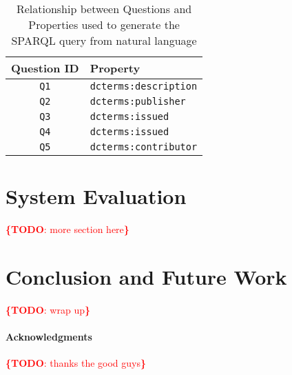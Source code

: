 \documentclass[runningheads,a4paper]{llncs}
\newcommand{\todo}[1]{\noindent\textcolor{red}{{\bf \{TODO}: #1{\bf \}}}}
\begin{document}
\begin{table}
\centering
\caption{Relationship between Questions and Properties used to generate the SPARQL query from natural language}
\label{tab:propTable}
\begin{tabular}{|c|l|} \hline
\textbf{Question ID} & \textbf{Property} \\ \hline
\texttt{Q1} & \texttt{dcterms:description}  \\ \hline
\texttt{Q2} & \texttt{dcterms:publisher}  \\ \hline 
\texttt{Q3} & \texttt{dcterms:issued}  \\ \hline
\texttt{Q4} & \texttt{dcterms:issued}  \\ \hline
\texttt{Q5} & \texttt{dcterms:contributor}  \\ \hline


\end{tabular}
\end{table}




\section{System Evaluation}
\label{sec:evaluation}



\todo{more section here}\\





\section{Conclusion and Future Work}
\label{sec:conclusion}
%

\todo{wrap up}

\paragraph{\textbf{Acknowledgments}} %
\todo{thanks the good guys} 




\end{document}

